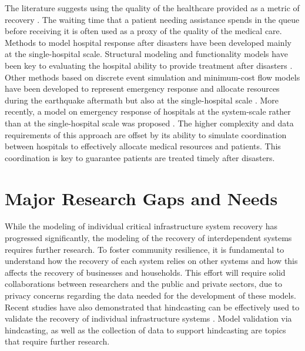 The literature suggests using the quality of the healthcare provided as a metric of recovery \citep{vieth2006effect, hamby2004using}. The waiting time that a patient needing assistance spends in the queue before receiving it is often used as a proxy of the quality of the medical care. Methods to model hospital response after disasters have been developed mainly at the single-hospital scale. Structural modeling and functionality models have been key to evaluating the hospital ability to provide treatment after disasters \citep{cimellaro2011performance,jacques2014resilience,yavari2010modeling}. Other methods based on discrete event simulation and minimum-cost flow models have been developed to represent emergency response and allocate resources during the earthquake aftermath but also at the single-hospital scale \citep{aghapour2019capacity,gul2015comprehensive,vugrin2015modeling,yi2005real}. More recently, a model on emergency response of hospitals at the system-scale rather than at the single-hospital scale was proposed \citep{ceferino2019effective}. The higher complexity and data requirements of this approach are offset by its ability to simulate coordination between hospitals to effectively allocate medical resources and patients. This coordination is key to guarantee patients are treated timely after disasters.\

\section{Major Research Gaps and Needs}
While the modeling of individual critical infrastructure system recovery has progressed significantly, the modeling of the recovery of interdependent systems requires further research. To foster community resilience, it is fundamental to understand how the recovery of each system relies on other systems and how this affects the recovery of businesses and households. This effort will require solid collaborations between researchers and the public and private sectors, due to privacy concerns regarding the data needed for the development of these models. Recent studies have also demonstrated that hindcasting can be effectively used to validate the recovery of individual infrastructure systems \citep{tomar2020hindcasting}. Model validation via hindcasting, as well as the collection of data to support hindcasting are topics that require further research. \

\FloatBarrier